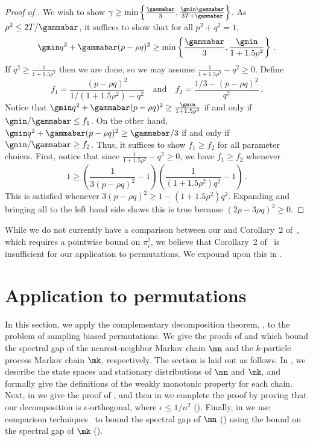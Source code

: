 %
%
%
\begin{proof}[Proof of ]
We wish to show $\gamma\geq \min\left\{\frac{\gammabar}{3}, 
\frac{\gmin\gammabar}{3T+\gammabar}\right\}$. As $\rho^2\leq 
2T/\gammabar$, it suffices to show that for all $p^2+q^2=1$,
 \[\gmin q^2+\gammabar(p-\rho q)^2\geq \min\left\{\frac{\gammabar}{3}, \frac{\gmin}{1+1.5\rho^2}\right\}\,.\]
 If $q^2\geq \frac{1}{1+1.5\rho^2}$ then we are done, so we may assume
 $\frac{1}{1+1.5\rho^2}-q^2\geq 0$.
 Define
  \[f_1=\frac{(p-\rho q)^2}{1/(1+1.5\rho^2) - q^2} \quad \text{and}
  \quad f_2=\frac{1/3 - (p-\rho q)^2}{q^2}\,.\]
 Notice that $\gmin q^2+\gammabar(p-\rho q)^2\geq
 \frac{\gmin}{1+1.5\rho^2}$ if and only if $\gmin/\gammabar\leq f_1$.
 On the other hand, $\gmin q^2+\gammabar(p-\rho q)^2\geq \gammabar/3$ if
 and only if $\gmin/\gammabar\geq f_2$.  Thus, it suffices to show
 $f_1\geq f_2$ for all parameter choices.
First, notice that since $\frac{1}{1+1.5\rho^2}-q^2\geq 0$, we have  $f_1\geq f_2$ whenever
 \[1\geq \left(\frac{1}{3(p-\rho
   q)^2}-1\right)\left(\frac{1}{(1+1.5\rho^2)q^2}-1\right)\,.\]
This is satisfied whenever $3(p-\rho q)^2\geq 1-(1+1.5\rho^2)q^2$.
Expanding and bringing all to the left hand side shows this is true because $(2p-3\rho q)^2\geq 0$.
\end{proof}
%

While we do not currently have a comparison between our
 and Corollary~2 of~\cite{jstv04}, which requires
a pointwise bound on $\pi_i^j$, we believe that Corollary~2 of~\cite{jstv04}
is insufficient for our application to permutations.  We expound
upon this in .


\section{Application to permutations}\label{sec:perm}
In this section, we apply the complementary decomposition theorem, 
, to the problem of sampling biased permutations.  
We give the proofs of  and  which bound the spectral gap of the nearest-neighbor Markov chain $\mn$ and the $k$-particle process Markov chain $\mk$, respectively.  
The section is laid out as follows.  In , 
we describe the state spaces and stationary distributions of $\mn$ and $\mk,$ and formally give the definitions of the weakly monotonic 
property for each chain.  Next, in  we give the proof of 
, and then in  we complete the 
proof by proving that our decomposition is 
%
$\epsilon$-orthogonal, where $\epsilon\leq 1/n^2$ %
(). Finally, in  we use comparison techniques~\cite{dsc, RT98} to bound the spectral gap of $\mn$ () using the bound on the spectral gap of $\mk$ ().   

